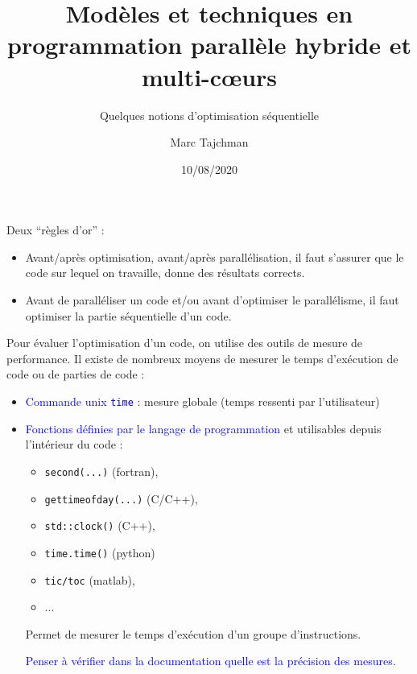 \documentclass{beamer}
\title{Modèles et techniques en programmation parallèle hybride et multi-c\oe urs}
\subtitle{Quelques notions d'optimisation séquentielle}
\author{Marc Tajchman}\institute{CEA - DEN/DM2S/STMF/LMES}
\date{10/08/2020}
\begin{document}
\begin{frame}
\titlepage
\end{frame}

\large
\begin{frame}
	Deux ``règles d'or'' :
	\begin{itemize}
		\item Avant/après optimisation, avant/après parallélisation, il faut s'assurer que le code sur lequel on travaille, donne des résultats corrects.
		
		\item Avant de paralléliser un code et/ou avant d'optimiser le parallélisme, il faut optimiser la partie séquentielle d'un code.
	\end{itemize}
\end{frame}

\begin{frame}
	Pour évaluer l'optimisation d'un code, on utilise des outils de mesure de performance.
	Il existe de nombreux moyens de mesurer le temps d’exécution de code ou de parties de
	code :
	
        \medskip
	\begin{itemize}
		\item \textcolor{blue}{Commande unix {\tt time}} : mesure globale (temps ressenti par l’utilisateur)
        \medskip

        \item \textcolor{blue}{Fonctions définies par le langage de programmation} et utilisables depuis l’intérieur du code :
	        \begin{itemize}
	          	\item {\tt second(...)} (fortran),
	          	\item {\tt gettimeofday(...)} (C/C++),
	          	\item {\tt std::clock()} (C++),
	          	\item {\tt time.time()} (python)
	          	\item {\tt 	tic/toc} (matlab),
	          	\item ...
          	\end{itemize}
		Permet de mesurer le temps d’exécution d’un groupe d’instructions.
		
		\textcolor{blue}{Penser à vérifier dans la documentation quelle est la précision des mesures.}
	\end{itemize}

\end{frame}
\end{document}
